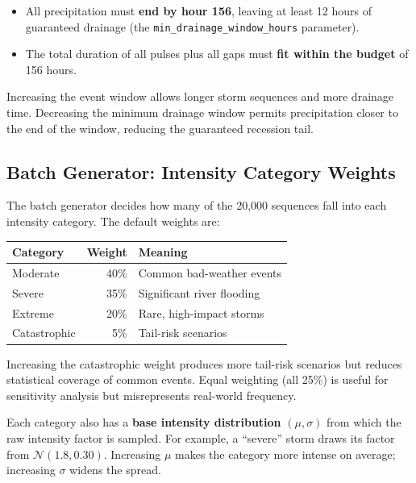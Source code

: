 \documentclass[11pt,a4paper]{article}
\begin{document}
\begin{itemize}
  \item All precipitation must \textbf{end by hour 156}, leaving at least
        12 hours of guaranteed drainage (the \texttt{min\_drainage\_window\_hours}
        parameter).
  \item The total duration of all pulses plus all gaps must \textbf{fit
        within the budget} of 156 hours.
\end{itemize}

\noindent Increasing the event window allows longer storm sequences and
more drainage time.  Decreasing the minimum drainage window permits
precipitation closer to the end of the window, reducing the guaranteed
recession tail.

\subsection{Batch Generator: Intensity Category Weights}

The batch generator decides how many of the 20,000 sequences fall into
each intensity category.  The default weights are:

\begin{center}
\begin{tabular}{lrl}
\toprule
\textbf{Category} & \textbf{Weight} & \textbf{Meaning} \\
\midrule
Moderate      & 40\% & Common bad-weather events \\
Severe        & 35\% & Significant river flooding \\
Extreme       & 20\% & Rare, high-impact storms \\
Catastrophic  &  5\% & Tail-risk scenarios \\
\bottomrule
\end{tabular}
\end{center}

\noindent Increasing the catastrophic weight produces more tail-risk
scenarios but reduces statistical coverage of common events.  Equal
weighting (all 25\%) is useful for sensitivity analysis but
misrepresents real-world frequency.

Each category also has a \textbf{base intensity distribution}
$(\mu, \sigma)$ from which the raw intensity factor is sampled.
For example, a ``severe'' storm draws its factor from
$\mathcal{N}(1.8, 0.30)$.  Increasing $\mu$ makes the category more
intense on average; increasing $\sigma$ widens the spread.
\end{document}
